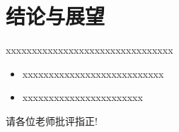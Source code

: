 \documentclass{beamer}
\begin{document}
\section{结论与展望}
\begin{frame}
	\qquad xxxxxxxxxxxxxxxxxxxxxxxxxxxxxxxx
	\vspace{5mm}
	\begin{itemize}
		\item xxxxxxxxxxxxxxxxxxxxxxxxxxx
		\item xxxxxxxxxxxxxxxxxxxxxxx\cite{1}
	\end{itemize}
\end{frame}	





\begin{frame}[allowframebreaks]
	
	
\end{frame}

\begin{frame}
	\begin{center}
		{\Huge 请各位老师批评指正!}
	\end{center}
\end{frame}
\end{document}
